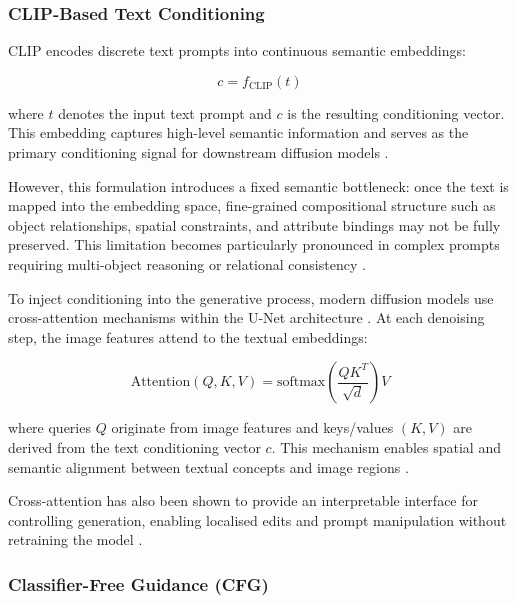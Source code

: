 \documentclass[a4paper,twoside,12pt]{report}
\begin{document}
\subsubsection{CLIP-Based Text Conditioning}

CLIP encodes discrete text prompts into continuous semantic embeddings:

\begin{equation}
c = f_{\text{CLIP}}(t)
\end{equation}

where \(t\) denotes the input text prompt and \(c\) is the resulting conditioning vector. This embedding captures high-level semantic information and serves as the primary conditioning signal for downstream diffusion models \citep{radford2021clip, rombach2022ldm, saharia2022imagen}.

However, this formulation introduces a fixed semantic bottleneck: once the text is mapped into the embedding space, fine-grained compositional structure such as object relationships, spatial constraints, and attribute bindings may not be fully preserved. This limitation becomes particularly pronounced in complex prompts requiring multi-object reasoning or relational consistency \citep{liu2022composable, huang2023t2icompbench, mehrabi2023ambiguities, elsharif2025ambiguity}.

To inject conditioning into the generative process, modern diffusion models use cross-attention mechanisms within the U-Net architecture \citep{vaswani2017attention, rombach2022ldm}. At each denoising step, the image features attend to the textual embeddings:

\begin{equation}
\text{Attention}(Q, K, V) = \text{softmax}\left(\frac{QK^T}{\sqrt{d}}\right)V
\end{equation}

where queries \(Q\) originate from image features and keys/values \((K, V)\) are derived from the text conditioning vector \(c\). This mechanism enables spatial and semantic alignment between textual concepts and image regions \citep{vaswani2017attention, hertz2022prompt, rombach2022ldm}.

Cross-attention has also been shown to provide an interpretable interface for controlling generation, enabling localised edits and prompt manipulation without retraining the model \citep{hertz2022prompt}.
\subsubsection{Classifier-Free Guidance (CFG)}
\end{document}
